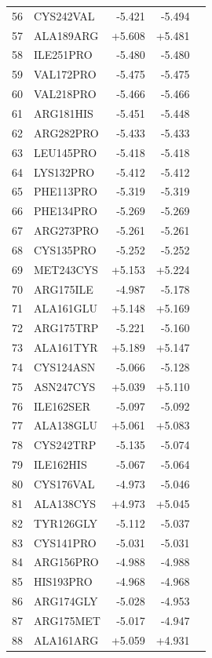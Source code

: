 \begin{longtable}{r l r r c}
56 & CYS242VAL & -5.421 & -5.494 &  \\
57 & ALA189ARG & +5.608 & +5.481 &  \\
58 & ILE251PRO & -5.480 & -5.480 &  \\
59 & VAL172PRO & -5.475 & -5.475 &  \\
60 & VAL218PRO & -5.466 & -5.466 &  \\
61 & ARG181HIS & -5.451 & -5.448 &  \\
62 & ARG282PRO & -5.433 & -5.433 &  \\
63 & LEU145PRO & -5.418 & -5.418 &  \\
64 & LYS132PRO & -5.412 & -5.412 &  \\
65 & PHE113PRO & -5.319 & -5.319 &  \\
66 & PHE134PRO & -5.269 & -5.269 &  \\
67 & ARG273PRO & -5.261 & -5.261 &  \\
68 & CYS135PRO & -5.252 & -5.252 &  \\
69 & MET243CYS & +5.153 & +5.224 &  \\
70 & ARG175ILE & -4.987 & -5.178 &  \\
71 & ALA161GLU & +5.148 & +5.169 &  \\
72 & ARG175TRP & -5.221 & -5.160 &  \\
73 & ALA161TYR & +5.189 & +5.147 &  \\
74 & CYS124ASN & -5.066 & -5.128 &  \\
75 & ASN247CYS & +5.039 & +5.110 &  \\
76 & ILE162SER & -5.097 & -5.092 &  \\
77 & ALA138GLU & +5.061 & +5.083 &  \\
78 & CYS242TRP & -5.135 & -5.074 &  \\
79 & ILE162HIS & -5.067 & -5.064 &  \\
80 & CYS176VAL & -4.973 & -5.046 &  \\
81 & ALA138CYS & +4.973 & +5.045 &  \\
82 & TYR126GLY & -5.112 & -5.037 &  \\
83 & CYS141PRO & -5.031 & -5.031 &  \\
84 & ARG156PRO & -4.988 & -4.988 &  \\
85 & HIS193PRO & -4.968 & -4.968 &  \\
86 & ARG174GLY & -5.028 & -4.953 &  \\
87 & ARG175MET & -5.017 & -4.947 &  \\
88 & ALA161ARG & +5.059 & +4.931 &  \\

\end{longtable}
